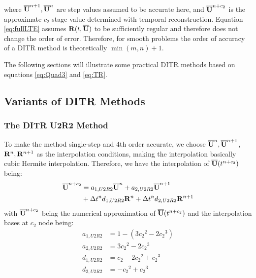 \documentclass[preprint,12pt]{elsarticle}
\begin{document}
where $\overline{\mathbf{U}}^{n+1}, \overline{\mathbf{U}}^{n}$ are step values assumed to be accurate here, and
$\overline{\mathbf{U}}^{n+c_2}$ is the approximate
$c_2$ stage value determined with temporal reconstruction.
Equation \eqref{eq:fullLTE} assumes
$\mathbf{R}(t, \overline{\mathbf{U}})$ to be sufficiently regular and therefore does not
change the order of error.
Therefore, for smooth problems the
order of accuracy of a DITR
method is theoretically $\min(m,n) + 1$.

The following sections will illustrate some
practical DITR methods based on equations \eqref{eq:Quad3} and \eqref{eq:TR}.


\subsection{Variants of DITR Methods}



\subsubsection{The DITR U2R2 Method}

To make the method single-step and 4th order accurate,
we choose $\overline{\mathbf{U}}^{n},\overline{\mathbf{U}}^{n+1}$, $\mathbf{R}^{n},\mathbf{R}^{n+1}$ as
the interpolation conditions, making the interpolation
basically cubic Hermite interpolation.
Therefore, we have the interpolation of $\overline{\mathbf{U}}(t^{n+c_2})$
being:
\begin{equation}
    \begin{aligned}
        \label{eq:TRU2R2}
        \overline{\mathbf{U}}^{n+c_2} & =
        a_{1,U2R2}\overline{\mathbf{U}}^{n} +
        a_{2,U2R2}\overline{\mathbf{U}}^{n + 1}
        \\ & +
        \mathrm\Delta t^n d_{1,U2R2}\mathbf{R}^{n} +
        \mathrm\Delta t^n d_{2,U2R2}\mathbf{R}^{n + 1}
    \end{aligned}
\end{equation}
with $\overline{\mathbf{U}}^{n+c_2}$ being
the numerical approximation
of $\overline{\mathbf{U}}(t^{n+c_2})$
and the interpolation bases at $c_2$ node being:
\begin{equation}
    \begin{aligned}
        a_{1,U2R2} & = 1 - (3{c_2}^2 - 2 {c_2}^3)  \\
        a_{2,U2R2} & = 3{c_2}^2 - 2 {c_2}^3        \\
        d_{1,U2R2} & = {c_2} - 2 {c_2}^2 + {c_2}^3 \\
        d_{2,U2R2} & = - {c_2}^2 + {c_2}^3         \\
    \end{aligned}
    \label{eq:interpU2R2}
\end{equation}
\end{document}
